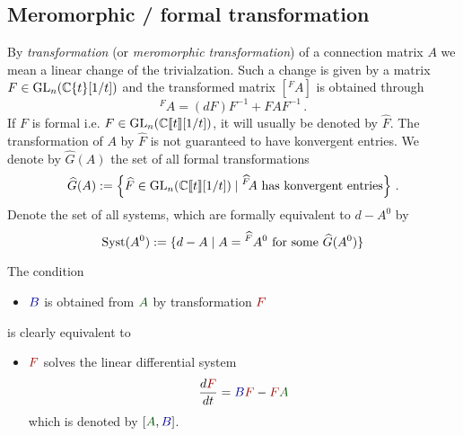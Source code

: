\subsection{Meromorphic / formal transformation}
\begin{comment}\footnotesize
  see \cite{thboalch} \textbf{Rem 1.41 on p. 16}:
  \begin{rem}
    Note that in most of the recent references we have used, Stokes matrices
    are used to classify
    \begin{itemize}
      \item meromorphic connections within fixed formal \textbf{meromorphic
        classes, modulo meromorphic equivalence}.
    \end{itemize}
    Whereas here we classify
    \begin{itemize}
      \item meromorphic connections within fixed \textbf{formal analytic
        classes, modulo analytic equivalence},
    \end{itemize}
    as is done in the older literature.  The fact is that the sets equivalence
    classes are the same in both cases. It is important for us to work with
    analytic, rather than meromorphic gauge transformations, because then the
    $\C^\infty$ viewpoint in Chapter 3 is cleaner. This distinction relates to
    the difference between \textbf{‘regular singular’} connections and
    \textbf{‘logarithmic’} connections.
  \end{rem}
\end{comment}
By \emph{transformation} (or \emph{meromorphic transformation}) of a connection
matrix $A$ we mean a linear change of the trivialzation. Such a change is given
by a matrix $F\in\operatorname{GL}_n(\mathbb{C}\{t\}[1/t])$ and the transformed matrix $[{}^F\!A]$ is
obtained through
\[
  {}^F\!A=(dF)F^{-1} + FAF^{-1} \,.
\]
If $F$ is formal i.e. $F\in\operatorname{GL}_n(\mathbb{C}\llbracket t\rrbracket[1/t])$, it will
usually be denoted by $\hat F$. The transformation of $A$ by $\hat F$ is not
guaranteed to have konvergent entries. We denote by $\hat G(A)$ the set of all
formal transformations
\[
  \widehat G(A):=\left\{\widehat F\in\operatorname{GL}_n(\mathbb{C}\llbracket t\rrbracket[1/t])
    \mid {}^{\widehat F}\!A \text{ has konvergent entries}
  \right\}\,.
\]
Denote the set of all systems, which are formally equivalent to $d-A^0$ by
\[
  \operatorname{Syst}(A^0):=\{d-A \mid A={}^{\widehat F}A^0 \text{ for some }\widehat G(A^0)\}
\]
\begin{rem}
  \def\myB{\textcolor{blue!60!black}{B}}
  \def\myA{\textcolor{green!30!black}{A}}
  \def\myF{\textcolor{red!60!black}{F}}
  The condition 
  \begin{itemize}
    \item[] $\myB$ is obtained from $\myA$ by transformation $\myF$
  \end{itemize}
  is clearly equivalent to
  \begin{itemize}
    \item[]  $\myF$ solves the linear differential system
      \[
        \frac{d\myF}{dt}=\myB\myF-\myF\myA
      \]
      which is denoted by $[\myA,\myB]$.
  \end{itemize}
\end{rem}

